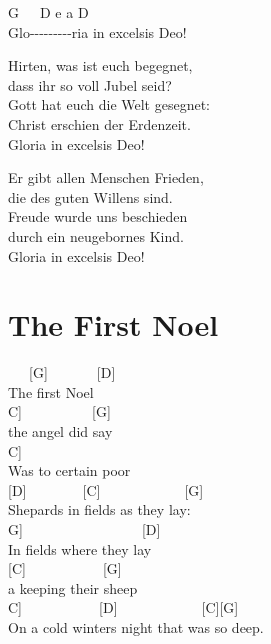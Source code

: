 \documentclass[
  letterpaper,
]{scrbook}
\begin{document}
G~~~D e a D\\
Glo-\/-\/-\/-\/-\/-\/-\/-\/-ria in excelsis Deo!

Hirten, was ist euch begegnet,\\
dass ihr so voll Jubel seid?\\
Gott hat euch die Welt gesegnet:\\
Christ erschien der Erdenzeit.\\
Gloria in excelsis Deo!

Er gibt allen Menschen Frieden,\\
die des guten Willens sind.\\
Freude wurde uns beschieden\\
durch ein neugebornes Kind.\\
Gloria in excelsis Deo!

\hypertarget{the-first-noel}{%
\chapter{The First Noel}\label{the-first-noel}}

~~~{[}G{]}~~~~~~~{[}D{]}\\
The first Noel\\
\hspace*{0.333em}\hspace*{0.333em}\hspace*{0.333em}{[}C{]}~~~~~~~~~~{[}G{]}\\
the angel did say\\
\hspace*{0.333em}\hspace*{0.333em}\hspace*{0.333em}\hspace*{0.333em}\hspace*{0.333em}\hspace*{0.333em}{[}C{]}\\
Was to certain poor\\
{[}D{]}~~~~~~~~{[}C{]}~~~~~~~~~~~~{[}G{]}\\
Shepards in fields as they lay:\\
\hspace*{0.333em}\hspace*{0.333em}{[}G{]}~~~~~~~~~~~~~~~~~{[}D{]}\\
In fields where they lay\\
{[}C{]}~~~~~~~~~~~{[}G{]}\\
a keeping their sheep\\
\hspace*{0.333em}\hspace*{0.333em}\hspace*{0.333em}\hspace*{0.333em}{[}C{]}~~~~~~~~~~~{[}D{]}~~~~~~~~~~~~{[}C{]}{[}G{]}\\
On a cold winter\textquotesingle s night that was so deep.
\end{document}
